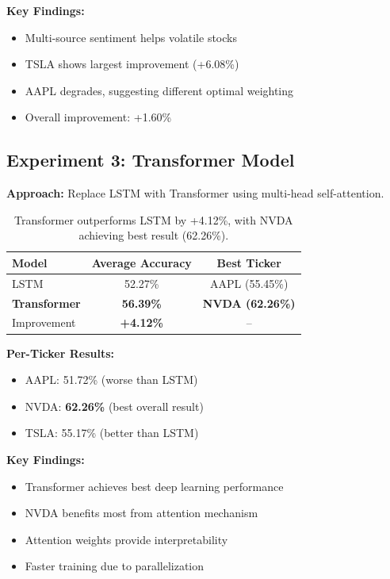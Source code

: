 \documentclass[10pt,twocolumn]{article}
\begin{document}
\textbf{Key Findings:}
\begin{itemize}
\item Multi-source sentiment helps volatile stocks
\item TSLA shows largest improvement (+6.08\%)
\item AAPL degrades, suggesting different optimal weighting
\item Overall improvement: +1.60\%
\end{itemize}

\subsection{Experiment 3: Transformer Model}

\textbf{Approach:} Replace LSTM with Transformer using multi-head self-attention.

\begin{table}[h]
\centering
\small
\begin{tabular}{lcc}
\toprule
Model & Average Accuracy & Best Ticker \\
\midrule
LSTM & 52.27\% & AAPL (55.45\%) \\
\textbf{Transformer} & \textbf{56.39\%} & \textbf{NVDA (62.26\%)} \\
\midrule
Improvement & \textbf{+4.12\%} & -- \\
\bottomrule
\end{tabular}
\caption{Transformer outperforms LSTM by +4.12\%, with NVDA achieving best result (62.26\%).}
\end{table}

\textbf{Per-Ticker Results:}
\begin{itemize}
\item AAPL: 51.72\% (worse than LSTM)
\item NVDA: \textbf{62.26\%} (best overall result)
\item TSLA: 55.17\% (better than LSTM)
\end{itemize}

\textbf{Key Findings:}
\begin{itemize}
\item Transformer achieves best deep learning performance
\item NVDA benefits most from attention mechanism
\item Attention weights provide interpretability
\item Faster training due to parallelization
\end{itemize}
\end{document}
